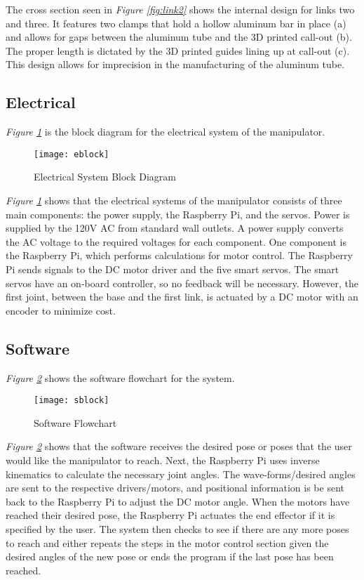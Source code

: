 The cross section seen in \emph{Figure \ref{fig:link2}} shows the internal design for links two and three. It features two clamps that hold a hollow aluminum bar in place (a) and allows for gaps between the aluminum tube and the 3D printed call-out (b). The proper length is dictated by the 3D printed guides lining up at call-out (c). This design allows for imprecision in the manufacturing of the aluminum tube.

\subsection{Electrical}
\emph{Figure \ref{fig:eblock}} is the block diagram for the electrical system of the manipulator.

\begin{figure}[htp]
  \centering
  \texttt{[image: eblock]}
  \caption{Electrical System Block Diagram}
  \label{fig:eblock}
\end{figure}

\emph{Figure \ref{fig:eblock}} shows that the electrical systems of the manipulator consists of three main components: the power supply, the Raspberry Pi, and the servos. Power is supplied by the 120V AC from standard wall outlets. A power supply converts the AC voltage to the required voltages for each component. One component is the Raspberry Pi, which performs calculations for motor control. The Raspberry Pi sends signals to the DC motor driver and the five smart servos. The smart servos have an on-board controller, so no feedback will be necessary. However, the first joint, between the base and the first link, is actuated by a DC motor with an encoder to minimize cost.
\newpage
\subsection{Software}
\emph{Figure \ref{fig:sblock}} shows the software flowchart for the system.
\begin{figure}[ht]
  \centering
  \texttt{[image: sblock]}
  \caption{Software Flowchart}
  \label{fig:sblock}
\end{figure}

\emph{Figure \ref{fig:sblock}} shows that the software receives the desired pose or poses that the user would like the manipulator to reach. Next, the Raspberry Pi uses inverse kinematics to calculate the necessary joint angles. The wave-forms/desired angles are sent to the respective drivers/motors, and positional information is be sent back to the Raspberry Pi to adjust the DC motor angle. When the motors have reached their desired pose, the Raspberry Pi actuates the end effector if it is specified by the user. The system then checks to see if there are any more poses to reach and either repeats the steps in the motor control section given the desired angles of the new pose or ends the program if the last pose has been reached.

